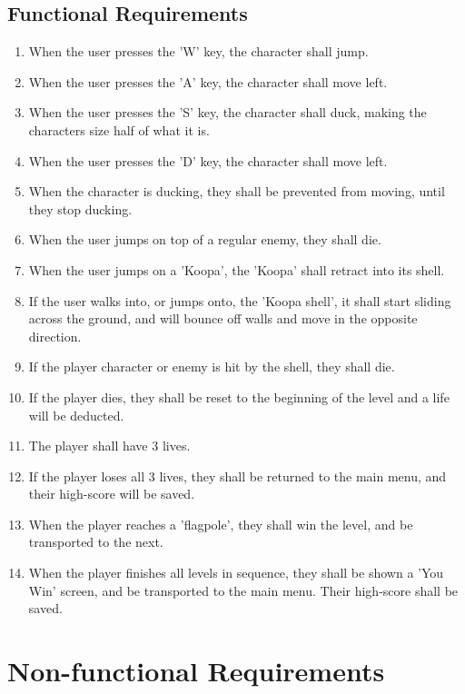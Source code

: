 \documentclass[12pt, titlepage]{article}
\begin{document}
\subsection{Functional Requirements}
\begin{enumerate}[{FR}1. ]
    \item When the user presses the 'W' key, the character shall jump.
    \item When the user presses the 'A' key, the character shall move left.
    \item When the user presses the 'S' key, the character shall duck, making the characters size half of what it is.
    \item When the user presses the 'D' key, the character shall move left.
    \item When the character is ducking, they shall be prevented from moving, until they stop ducking.
    \item When the user jumps on top of a regular enemy, they shall die.
    \item When the user jumps on a 'Koopa', the 'Koopa' shall retract into its shell.
    \item If the user walks into, or jumps onto, the 'Koopa shell', it shall start sliding across the ground, and will bounce off walls and move in the opposite direction.
    \item If the player character or enemy is hit by the shell, they shall die.
    \item If the player dies, they shall be reset to the beginning of the level and a life will be deducted.
    \item The player shall have 3 lives.
    \item If the player loses all 3 lives, they shall be returned to the main menu, and their high-score will be saved.
    \item When the player reaches a 'flagpole', they shall win the level, and be transported to the next.
    \item When the player finishes all levels in sequence, they shall be shown a 'You Win' screen, and be transported to the main menu. Their high-score shall be saved.
\end{enumerate}
\section{Non-functional Requirements}
\end{document}
